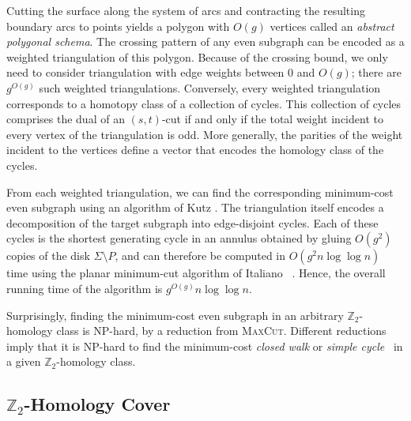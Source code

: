 \documentclass[natbib]{svcyclop}
\def\Z{\mathbb{Z}}
\begin{document}
Cutting the surface along the system of arcs and contracting the resulting boundary arcs to points yields a polygon with $O(g)$ vertices called an \emph{abstract polygonal schema}.
The crossing pattern of any even subgraph can be encoded as a weighted triangulation of this polygon.  Because of the crossing bound, we only need to consider triangulation with edge weights between $0$ and $O(g)$; there are $g^{O(g)}$ such weighted triangulations.
Conversely, every weighted triangulation corresponds to a homotopy class of a collection of cycles.  This collection of cycles comprises the dual of an $(s,t)$-cut if and only if the total weight incident to every vertex of the triangulation is odd.  More generally, the parities of the weight incident to the vertices define a vector that encodes the homology class of the cycles.

From each weighted triangulation, we can find the corresponding minimum-cost even subgraph using an algorithm of Kutz \cite{k-csnco-06}.  The triangulation itself encodes a decomposition of the target subgraph into edge-disjoint cycles.  Each of these cycles is the shortest generating cycle in an annulus obtained by gluing $O(g^2)$ copies of the disk $\Sigma\setminus P$, and can therefore be computed in $O(g^2n\log\log n)$ time using the planar minimum-cut algorithm of Italiano \etal~\cite{insw-iamcmf-11}.
Hence, the overall running time of the algorithm is $g^{O(g)}n\log\log n$.

Surprisingly, finding the minimum-cost even subgraph in an arbitrary $\Z_2$-homology class is NP-hard, by a reduction from \textsc{MaxCut}.  Different reductions imply that it is NP-hard to find the minimum-cost \emph{closed walk} \cite{ccelw-scsih-08} or \emph{simple cycle}~\cite{c-fscss-10} in a given $\Z_2$-homology class.

\subsection{$\Z_2$-Homology Cover}
\end{document}
